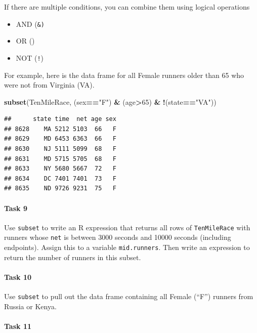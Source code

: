 \documentclass[
]{article}
\newenvironment{Shaded}{\begin{snugshade}}{\end{snugshade}}
\newcommand{\DecValTok}[1]{\textcolor[rgb]{0.00,0.00,0.81}{#1}}
\newcommand{\FunctionTok}[1]{\textcolor[rgb]{0.13,0.29,0.53}{\textbf{#1}}}
\newcommand{\NormalTok}[1]{#1}
\newcommand{\SpecialCharTok}[1]{\textcolor[rgb]{0.81,0.36,0.00}{\textbf{#1}}}
\newcommand{\StringTok}[1]{\textcolor[rgb]{0.31,0.60,0.02}{#1}}
\begin{document}
If there are multiple conditions, you can combine them using logical
operations

\begin{itemize}
\item
  AND (\texttt{\&)}
\item
  OR (\texttt{\textbar{}})
\item
  NOT (\texttt{!})
\end{itemize}

For example, here is the data frame for all Female runners older than 65
who were not from Virginia (VA).

\begin{Shaded}
\begin{Highlighting}[]
\FunctionTok{subset}\NormalTok{(TenMileRace, (sex}\SpecialCharTok{==}\StringTok{"F"}\NormalTok{) }\SpecialCharTok{\&}\NormalTok{ (age}\SpecialCharTok{\textgreater{}}\DecValTok{65}\NormalTok{) }\SpecialCharTok{\&} \SpecialCharTok{!}\NormalTok{(state}\SpecialCharTok{==}\StringTok{"VA"}\NormalTok{))}
\end{Highlighting}
\end{Shaded}

\begin{verbatim}
##      state time  net age sex
## 8628    MA 5212 5103  66   F
## 8629    MD 6453 6363  66   F
## 8630    NJ 5111 5099  68   F
## 8631    MD 5715 5705  68   F
## 8633    NY 5680 5667  72   F
## 8634    DC 7401 7401  73   F
## 8635    ND 9726 9231  75   F
\end{verbatim}

\paragraph{Task 9}\label{task-9}

Use \texttt{subset} to write an R expression that returns all rows of
\texttt{TenMileRace} with runners whose \texttt{net} is between 3000
seconds and 10000 seconds (including endpoints). Assign this to a
variable \texttt{mid.runners}. Then write an expression to return the
number of runners in this subset.

\paragraph{Task 10}\label{task-10}

Use \texttt{subset} to pull out the data frame containing all Female
(``F'') runners from Russia or Kenya.

\paragraph{Task 11}\label{task-11}
\end{document}
